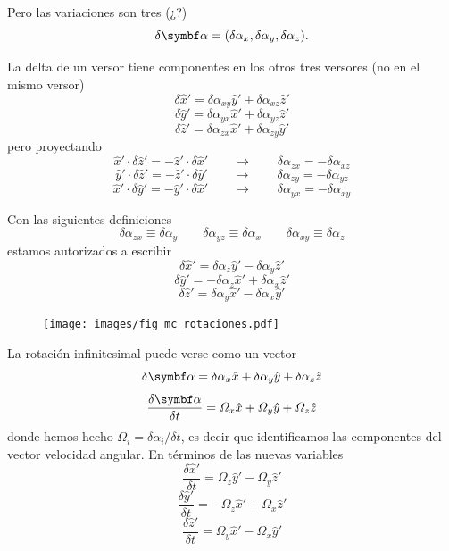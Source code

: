\documentclass[10pt,oneside]{CBFT_book}
\begin{document}
Pero las variaciones son tres (¿?)
\[
	\delta\vb{\alpha} = ( \delta\alpha_x, \delta\alpha_y, \delta\alpha_z).
\]

La delta de un versor tiene componentes en los otros tres versores (no en el mismo versor)
\[
	\delta\hat{x}' = \delta \alpha_{xy}\hat{y}' + \delta \alpha_{xz}\hat{z}'
\]
\[
	\delta\hat{y}' = \delta \alpha_{yx}\hat{x}' + \delta \alpha_{yz}\hat{z}'
\]
\[
	\delta\hat{z}' = \delta \alpha_{zx}\hat{x}' + \delta \alpha_{zy}\hat{y}'
\]
pero proyectando
\[
	\hat{x}'\cdot\delta\hat{z}' =  - \hat{z}'\cdot\delta\hat{x}' \qquad \longrightarrow \qquad 
					\delta\alpha_{zx} = -\delta\alpha_{xz}
\]
\[
	\hat{y}'\cdot\delta\hat{z}' =  - \hat{z}'\cdot\delta\hat{y}' \qquad \longrightarrow  \qquad 
					\delta\alpha_{zy} = -\delta\alpha_{yz}
\]
\[
	\hat{x}'\cdot\delta\hat{y}' =  - \hat{y}'\cdot\delta\hat{x}' \qquad \longrightarrow  \qquad 
					\delta\alpha_{yx} = -\delta\alpha_{xy}
\]

Con las siguientes definiciones 
\[
	\delta\alpha_{zx} \equiv \delta\alpha_y \qquad 
	\delta\alpha_{yz} \equiv \delta\alpha_x \qquad
	\delta\alpha_{xy} \equiv \delta\alpha_z 
\]
estamos autorizados a escribir
\[
	\delta\hat{x}' = \delta \alpha_z \hat{y}' - \delta \alpha_y \hat{z}'
\]
\[
	\delta\hat{y}' = - \delta \alpha_z \hat{x}' + \delta \alpha_x \hat{z}'
\]
\[
	\delta\hat{z}' = \delta \alpha_y \hat{x}' - \delta \alpha_x \hat{y}'
\]
\begin{figure}[htb]
	\begin{center}
	\texttt{[image: images/fig\_mc\_rotaciones.pdf]}	 
	\end{center}
	\caption{}
\end{figure} 
La rotación infinitesimal puede verse como un vector 
\[
	\delta\vb{\alpha} = \delta\alpha_x \hat{x} + \delta\alpha_y \hat{y} +  \delta\alpha_z \hat{z} 
\]
\[
	\frac{\delta\vb{\alpha}}{\delta t} = \Omega_x \hat{x} + \Omega_y \hat{y} +  \Omega_z \hat{z} 
\]
donde hemos hecho $\Omega_i = \delta\alpha_i/\delta t$, es decir que identificamos las componentes del vector velocidad angular. 
En términos de las nuevas variables
\[
	\frac{ \delta \hat{x}' }{ \delta t } = \Omega_z \hat{y}' - \Omega_y \hat{z}'
\]
\[
	\frac{ \delta \hat{y}' }{ \delta t }  = - \Omega_z \hat{x}' + \Omega_x \hat{z}'
\]
\[
	\frac{ \delta \hat{z}' }{ \delta t } = \Omega_y \hat{x}' - \Omega_x \hat{y}'
\]
\end{document}
